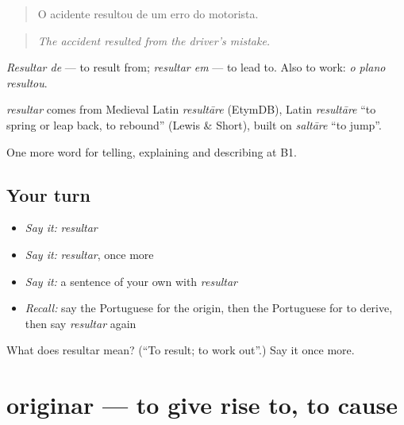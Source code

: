 \begin{quote}
O acidente resultou de um erro do motorista.
\end{quote}

\begin{quote}
\emph{The accident resulted from the driver's mistake.}
\end{quote}

\emph{Resultar de} — to result from; \emph{resultar em} — to lead to. Also to work: \emph{o plano resultou}.

\begin{cousinweb}
\emph{resultar} comes from Medieval Latin \emph{resultāre} (EtymDB), Latin \emph{resultāre} \textquotedblleft{}to spring or leap back, to rebound\textquotedblright{} (Lewis \& Short), built on \emph{saltāre} \textquotedblleft{}to jump\textquotedblright{}.
\end{cousinweb}

\begin{grammarlens}[title={What you've built}]
One more word for telling, explaining and describing at B1.
\end{grammarlens}

\subsection*{Your turn}
\begin{itemize}
\raggedright
  \item \emph{Say it:} \emph{resultar}
  \item \emph{Say it:} \emph{resultar}, once more
  \item \emph{Say it:} a sentence of your own with \emph{resultar}
  \item \emph{Recall:} say the Portuguese for the origin, then the Portuguese for to derive, then say \emph{resultar} again
\end{itemize}

\begin{tcolorbox}[breakable,colback=teal!4,colframe=teal!35!black,title={Before you move on}]
What does resultar mean? (\textquotedblleft{}To result; to work out\textquotedblright{}.) Say it once more.
\end{tcolorbox}
\section[originar]{originar — to give rise to, to cause}

\label{lesson:PT-C350-originar}



